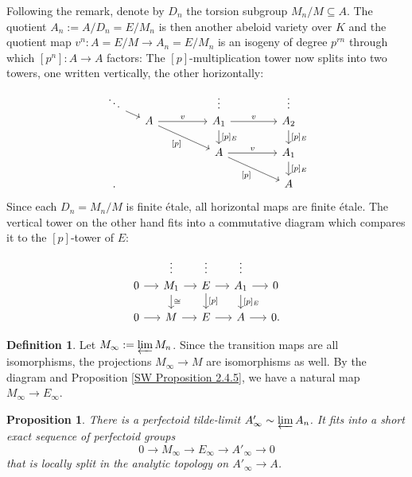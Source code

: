 \documentclass[10pt,oneside]{amsart}
\newtheorem{proposition}[theorem]{Proposition}
\theoremstyle{definition}
\newtheorem{definition}[theorem]{Definition}
\begin{document}
	Following the remark, denote by $D_n$ the torsion subgroup $M_n/M\subseteq A$. The quotient $A_n:=A/D_n = E/M_n$ is then another abeloid variety over $K$ and the quotient map $v^n:A=E/M\rightarrow A_n=E/M_n$ is an isogeny of degree $p^{rn}$  through which  $[p^n]:A\rightarrow A$ factors: The $[p]$-multiplication tower now splits into two towers, one written vertically, the other horizontally:
		\begin{equation}\label{p-multiplication tower of E/M splits into vertical and horizontal tower}
		\begin{tikzcd}[column sep={1.1cm,between origins},row sep={0.5cm,between origins}]
			\ddots \arrow[rd] &  &  & \vdots &  & \vdots \\
			& A \arrow[rr,"v"] \arrow[rrdd, "{[p]}"'] &  & A_1 \arrow[rr,"v"] \arrow[dd,"{[p]_E}"] &  & A_2 \arrow[dd,"{[p]_E}"] \\
			&  &  &  &  &  \\
			&  &  & A \arrow[rrdd, "{[p]}"'] \arrow[rr,"v"] &  & A_1 \arrow[dd,"{[p]_E}"] \\
			&  &  &  &  &  \\.
			&  &  &  &  & A
		\end{tikzcd}
		\end{equation}
		Since each $D_n=M_n/M$ is finite \'etale, all horizontal maps are finite \'etale. The vertical tower on the other hand fits into a commutative diagram which compares it to the $[p]$-tower of $E$:
		\begin{equation}\label{F-tower for E/M}
		\begin{tikzcd}[column sep={1.1cm,between origins},row sep={0.5cm,between origins}]
			&\vdots&\vdots&\vdots&\\
			0 \arrow[r] & M_1 \arrow[dd, "\cong"] \arrow[r] & E \arrow[dd, "{[p]}"] \arrow[r] & A_1 \arrow[dd, "{[p]_E}"] \arrow[r] & 0 \\
			\\
			0 \arrow[r] & M \arrow[r] & E \arrow[r] & A \arrow[r] & 0.
		\end{tikzcd}
		\end{equation}
		\begin{definition}
			Let $M_\infty:=\varprojlim M_n$. Since the transition maps are all isomorphisms, the projections $M_\infty\to M$ are isomorphisms as well. By the diagram and Proposition \ref{SW Proposition 2.4.5}, we have a natural map $M_\infty\to E_\infty$. 
		\end{definition}
		\begin{proposition}\label{M_infty->E_infty->A'_infty}
			There is a perfectoid tilde-limit $A'_\infty\sim \varprojlim A_n$. It fits into a short exact sequence of perfectoid groups 
			\[0\to M_\infty\to E_\infty\to A'_\infty\to 0 \]
			that is  locally split in the analytic topology on $A'_\infty\to A$.
		\end{proposition}
\end{document}
